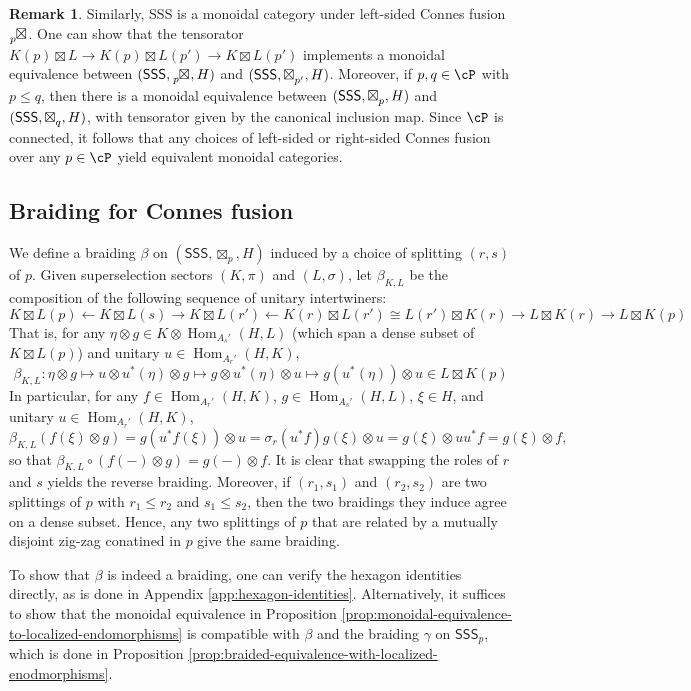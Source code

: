 \documentclass[11pt,reqno]{amsart}
\DeclareMathOperator{\Hom}{Hom}
\newcommand{\SSS}{\mathsf{SSS}}
\numberwithin{equation}{section}
\theoremstyle{plain}
\theoremstyle{definition}
\newtheorem{remark}[equation]{Remark}
\begin{document}
\begin{remark}\label{remark:left-right-monoidal-equivalence}
Similarly, SSS is a monoidal category under left-sided Connes fusion $\tensor*[_p]{\boxtimes}{}$. One can show that the tensorator $K(p)\boxtimes L\to K(p)\boxtimes L(p')\to K\boxtimes L(p')$ implements a monoidal equivalence between $(\SSS,\tensor*[_p]{\boxtimes}{},H)$ and $(\SSS,\tensor*[]{\boxtimes}{_{p'}},H)$. Moreover, if $p,q\in\cP$ with $p\leq q$, then there is a monoidal equivalence between $(\SSS,\tensor*[]{\boxtimes}{_p},H)$ and $(\SSS,\tensor*[]{\boxtimes}{_q},H)$, with tensorator given by the canonical inclusion map. Since $\cP$ is connected, it follows that any choices of left-sided or right-sided Connes fusion over any $p\in\cP$ yield equivalent monoidal categories. 
\end{remark}

\subsection{Braiding for Connes fusion}

We define a braiding $\beta$ on $(\SSS,\boxtimes_p,H)$ induced by a choice of splitting $(r,s)$ of $p$. 
Given superselection sectors $(K, \pi)$ and $(L,\sigma)$, let $\beta_{K,L}$ be the composition of the following sequence of unitary intertwiners:
\[
K \boxtimes L(p) \leftarrow K \boxtimes L(s) \rightarrow K \boxtimes L(r') \leftarrow K(r) \boxtimes L(r') \cong L(r') \boxtimes K(r) \rightarrow L \boxtimes K(r) \rightarrow L \boxtimes K(p)
\]
That is, for any $\eta\otimes g\in K\otimes\Hom_{A_{s}'}(H,L) $ (which span a dense subset of $K\boxtimes L(p)$) and unitary $u \in \Hom_{A_r'}(H,K)$,
\[
\beta_{K,L}:\eta\otimes g\mapsto u\otimes u^*(\eta)\otimes g\mapsto g\otimes u^*(\eta)\otimes u\mapsto g(u^*(\eta))\otimes u\in L\boxtimes K(p)
\]
In particular, for any $f \in \Hom_{A_r'}(H,K)$, $g \in \Hom_{A_s'}(H,L)$, $\xi \in H$, and unitary $u \in \Hom_{A_r'}(H,K)$,
\[
\beta_{K,L}(f(\xi)\otimes g)=g(u^*f(\xi))\otimes u=\sigma_r(u^*f)g(\xi)\otimes u=g(\xi)\otimes uu^*f=g(\xi)\otimes f,
\]
so that $\beta_{K,L}\circ(f(-)\otimes g)=g(-)\otimes f$. It is clear that swapping the roles of $r$ and $s$ yields the reverse braiding. Moreover, if $(r_1,s_1)$ and $(r_2,s_2)$ are two splittings of $p$ with $r_1\leq r_2$ and $s_1\leq s_2$, then the two braidings they induce agree on a dense subset. Hence, any two splittings of $p$ that are related by a mutually disjoint zig-zag conatined in $p$ give the same braiding.

To show that $\beta$ is indeed a braiding, one can verify the hexagon identities directly, as is done in Appendix \ref{app:hexagon-identities}. Alternatively, it suffices to show that the monoidal equivalence in Proposition \ref{prop:monoidal-equivalence-to-localized-endomorphisms} is compatible with $\beta$ and the braiding $\gamma$ on $\SSS_p$, which is done in Proposition \ref{prop:braided-equivalence-with-localized-enodmorphisms}.
\end{document}
